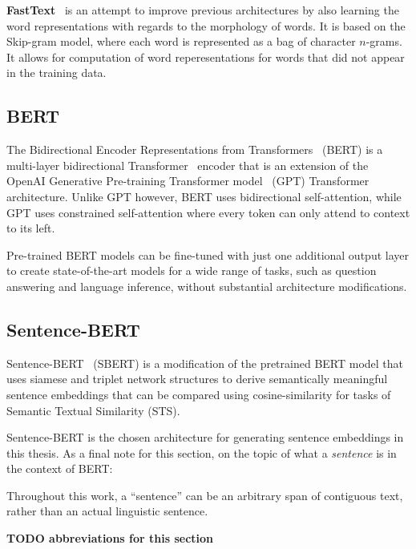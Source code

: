 \documentclass[oneside, english, bibtex]{kththesis}
\begin{document}
\textbf{FastText}~\cite{DBLP:journals/corr/BojanowskiGJM16} is an attempt to improve previous architectures by also learning the word representations with regards to the morphology of words. It is based on the Skip-gram model, where each word is represented as a bag of character $n$-grams. It allows for computation of word reperesentations for words that did not appear in the training data. 

\subsection{BERT}

The Bidirectional Encoder Representations from Transformers~\cite{devlin2018bert} (BERT) is a multi-layer bidirectional Transformer~\cite{46201} encoder that is an extension of the OpenAI Generative Pre-training Transformer model~\cite{radford2018improving}  (GPT) Transformer architecture. Unlike GPT however, BERT uses bidirectional self-attention, while GPT uses constrained self-attention where every token can only attend to context to its left.

Pre-trained BERT models can be fine-tuned with just one additional output layer to create state-of-the-art models for a wide range of tasks, such as question answering and language inference, without substantial architecture modifications.

\subsection{Sentence-BERT}

Sentence-BERT~\cite{reimers-2019-sentence-bert, reimers-2020-multilingual-sentence-bert} (SBERT) is a modification of the pretrained BERT model that uses siamese and triplet network structures to derive semantically meaningful sentence embeddings that can be compared using cosine-similarity for tasks of Semantic Textual Similarity (STS). 

Sentence-BERT is the chosen architecture for generating sentence embeddings in this thesis. As a final note for this section, on the topic of what a \textit{sentence} is in the context of BERT:


\begin{displayquote}
Throughout this work, a “sentence” can be an arbitrary span of contiguous text, rather than an actual linguistic sentence.~\cite{devlin2018bert}
\end{displayquote}

\textbf{TODO abbreviations for this section}
\end{document}
